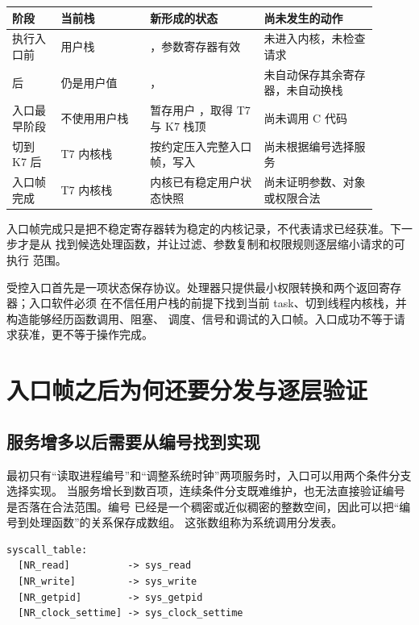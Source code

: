 \begin{longtable}{|L{0.12\linewidth}|L{0.22\linewidth}|L{0.28\linewidth}|L{0.28\linewidth}|}
\hline
阶段 & 当前栈 & 新形成的状态 & 尚未发生的动作 \\ \hline
执行入口前 & 用户栈 & ，参数寄存器有效 & 未进入内核，未检查请求 \\ \hline
{} 后 &  仍是用户值 & ， & 未自动保存其余寄存器，未自动换栈 \\ \hline
入口最早阶段 & 不使用用户栈 & 暂存用户 ，取得 T7 与 K7 栈顶 & 尚未调用 C 代码 \\ \hline
切到 K7 后 & T7 内核栈 & 按约定压入完整入口帧，写入  & 尚未根据编号选择服务 \\ \hline
入口帧完成 & T7 内核栈 & 内核已有稳定用户状态快照 & 尚未证明参数、对象或权限合法 \\ \hline
\end{longtable}

入口帧完成只是把不稳定寄存器转为稳定的内核记录，不代表请求已经获准。下一步才是从
 找到候选处理函数，并让过滤、参数复制和权限规则逐层缩小请求的可执行
范围。

\begin{keyidea}
受控入口首先是一项状态保存协议。处理器只提供最小权限转换和两个返回寄存器；入口软件必须
在不信任用户栈的前提下找到当前 task、切到线程内核栈，并构造能够经历函数调用、阻塞、
调度、信号和调试的入口帧。入口成功不等于请求获准，更不等于操作完成。
\end{keyidea}

\section{入口帧之后为何还要分发与逐层验证}

\subsection{服务增多以后需要从编号找到实现}

最初只有“读取进程编号”和“调整系统时钟”两项服务时，入口可以用两个条件分支选择实现。
当服务增长到数百项，连续条件分支既难维护，也无法直接验证编号是否落在合法范围。编号
已经是一个稠密或近似稠密的整数空间，因此可以把“编号到处理函数”的关系保存成数组。
这张数组称为系统调用分发表。

\begin{lstlisting}
syscall_table:
  [NR_read]          -> sys_read
  [NR_write]         -> sys_write
  [NR_getpid]        -> sys_getpid
  [NR_clock_settime] -> sys_clock_settime
\end{lstlisting}

